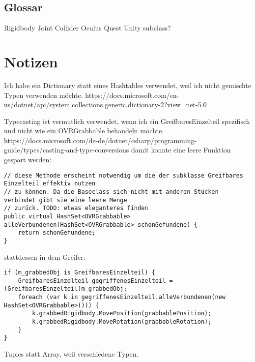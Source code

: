 \documentclass[11pt]{article} %
\begin{document}
\subsection{Glossar}

Rigidbody
Joint
Collider
Oculus
Quest
Unity
subclass?

\section{Notizen}

Ich habe ein Dictionary statt eines Hashtables verwendet, weil ich nicht gemischte Typen verwenden möchte. 
https://docs.microsoft.com/en-us/dotnet/api/system.collections.generic.dictionary-2?view=net-5.0


Typecasting ist vermutlich verwendet, wenn ich ein GreifbaresEinzelteil spezifisch und nicht wie ein OVRGrabbable behandeln möchte. 
https://docs.microsoft.com/de-de/dotnet/csharp/programming-guide/types/casting-and-type-conversions
damit konnte eine leere Funktion gespart werden:

\begin{lstlisting}
// diese Methode erscheint notwendig um die der subklasse Greifbares Einzelteil effektiv nutzen 
// zu können. Da die Baseclass sich nicht mit anderen Stücken verbindet gibt sie eine leere Menge
// zurück. TODO: etwas eleganteres finden
public virtual HashSet<OVRGrabbable> alleVerbundenen(HashSet<OVRGrabbable> schonGefundene) {
	return schonGefundene;
}
\end{lstlisting}

stattdessen in dem Greifer: 

\begin{lstlisting}
if (m_grabbedObj is GreifbaresEinzelteil) {
	GreifbaresEinzelteil gegriffenesEinzelteil = (GreifbaresEinzelteil)m_grabbedObj;
	foreach (var k in gegriffenesEinzelteil.alleVerbundenen(new HashSet<OVRGrabbable>())) {
		k.grabbedRigidbody.MovePosition(grabbablePosition);
		k.grabbedRigidbody.MoveRotation(grabbableRotation);
	}
}
\end{lstlisting}

Tuples statt Array, weil verschiedene Typen.
\end{document}
